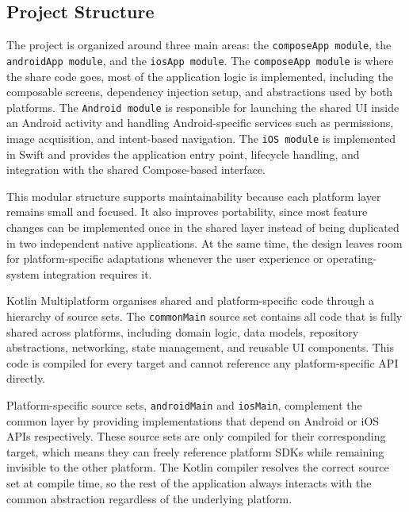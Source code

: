 \subsection{Project Structure}

The project is organized around three main areas: the \texttt{composeApp module}, the \texttt{androidApp module}, and the \texttt{iosApp module}. The \texttt{composeApp module} is where the share code goes, most of the application logic is implemented, including the composable screens, dependency injection setup, and abstractions used by both platforms. The \texttt{Android module} is responsible for launching the shared UI inside an Android activity and handling Android-specific services such as permissions, image acquisition, and intent-based navigation. The \texttt{iOS module} is implemented in Swift and provides the application entry point, lifecycle handling, and integration with the shared Compose-based interface.

This modular structure supports maintainability because each platform layer remains small and focused. It also improves portability, since most feature changes can be implemented once in the shared layer instead of being duplicated in two independent native applications. At the same time, the design leaves room for platform-specific adaptations whenever the user experience or operating-system integration requires it.



Kotlin Multiplatform organises shared and platform-specific code through a hierarchy of source sets. The \texttt{commonMain} source set contains all code that is fully shared across platforms, including domain logic, data models, repository abstractions, networking, state management, and reusable UI components. This code is compiled for every target and cannot reference any platform-specific API directly.

Platform-specific source sets, \texttt{androidMain} and \texttt{iosMain}, complement the common layer by providing implementations that depend on Android or iOS APIs respectively. These source sets are only compiled for their corresponding target, which means they can freely reference platform SDKs while remaining invisible to the other platform. The Kotlin compiler resolves the correct source set at compile time, so the rest of the application always interacts with the common abstraction regardless of the underlying platform.

